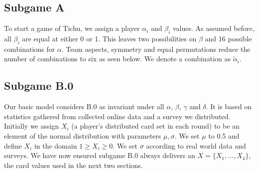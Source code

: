 \subsection{Subgame A}
To start a game of Tichu, we assign a player $\alpha_i$ and $\beta_i$ values. As assumed before, all $\beta_i$ are equal at either 0 or 1. This leaves two possibilities on $\beta$ and 16 possible combinations for $\alpha$. Team aspects, symmetry and equal permutations reduce the number of combinations to six as seen below. We denote a combination as $\tilde{\alpha}_i$.\\
\begin{table}[h]
\end{table}
\begin{table}[h]
\end{table}
\subsection{Subgame B.0}
Our basic model considers B.0 as invariant under all $\alpha$, $\beta$, $\gamma$ and $\delta$. It is based on statistics gathered from collected online data and a survey we distributed. Initially we assign $X_i$ (a player’s distributed card set in each round) to be an element of the normal distribution with parameters $\mu, \sigma$. We set $\mu$ to 0.5 and define $X_i$ in the domain $1\geq X_i \geq 0$. We set $\sigma$ according to real world data and surveys. We have now ensured subgame B.0 always delivers an $X = \{X_1, …, X_4\}$, the card values used in the next two sections.


